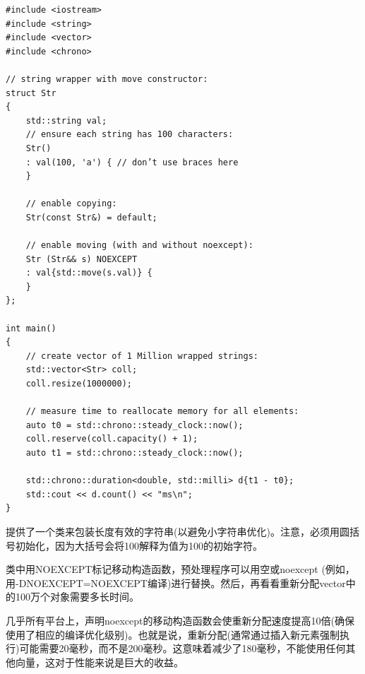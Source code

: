 \begin{lstlisting}[caption={}]
#include <iostream>
#include <string>
#include <vector>
#include <chrono>

// string wrapper with move constructor:
struct Str
{
	std::string val;
	// ensure each string has 100 characters:
	Str()
	: val(100, 'a') { // don’t use braces here
	}

	// enable copying:
	Str(const Str&) = default;
	
	// enable moving (with and without noexcept):
	Str (Str&& s) NOEXCEPT
	: val{std::move(s.val)} {
	}
};

int main()
{
	// create vector of 1 Million wrapped strings:
	std::vector<Str> coll;
	coll.resize(1000000);
	
	// measure time to reallocate memory for all elements:
	auto t0 = std::chrono::steady_clock::now();
	coll.reserve(coll.capacity() + 1);
	auto t1 = std::chrono::steady_clock::now();
	
	std::chrono::duration<double, std::milli> d{t1 - t0};
	std::cout << d.count() << "ms\n";
}
\end{lstlisting}

提供了一个类来包装长度有效的字符串(以避免小字符串优化)。注意，必须用圆括号初始化，因为大括号会将100解释为值为100的初始字符。\par

类中用NOEXCEPT标记移动构造函数，预处理程序可以用空或noexcept (例如，用-DNOEXCEPT=NOEXCEPT编译)进行替换。然后，再看看重新分配vector中的100万个对象需要多长时间。\par

几乎所有平台上，声明noexcept的移动构造函数会使重新分配速度提高10倍(确保使用了相应的编译优化级别)。也就是说，重新分配(通常通过插入新元素强制执行)可能需要20毫秒，而不是200毫秒。这意味着减少了180毫秒，不能使用任何其他向量，这对于性能来说是巨大的收益。\par





